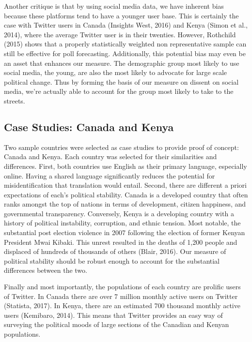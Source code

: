 \documentclass[12pt]{article}
\begin{document}
\begin{spacing}{1.5}
Another critique is that by using social media data, we have inherent bias because these platforms tend to have a younger user base. This is certainly the case with Twitter users in Canada (Insights West, 2016) and Kenya (Simon et al., 2014), where the average Twitter user is in their twenties. However, Rothchild (2015) shows that a properly statistically weighted non representative sample can still be effective for poll forecasting. Additionally, this potential bias may even be an asset that enhances our measure. The demographic group most likely to use social media, the young, are also the most likely to advocate for large scale political change. Thus by forming the basis of our measure on dissent on social media, we're actually able to account for the group most likely to take to the streets.

\subsection*{Case Studies: Canada and Kenya}

Two sample countries were selected as case studies to provide proof of concept: Canada and Kenya. Each country was selected for their similarities and differences. First, both countries use English as their primary language, especially online. Having a shared language significantly reduces the potential for misidentification that translation would entail. Second, there are different a priori expectations of each’s political stability. Canada is a developed country that often ranks amongst the top of nations in terms of development, citizen happiness, and governmental transparency. Conversely, Kenya is a developing country with a history of political instability, corruption, and ethnic tension. Most notable, the substantial post election violence in 2007 following the election of former Kenyan President Mwai Kibaki. This unrest resulted in the deaths of 1,200 people and displaced of hundreds of thousands of others (Blair, 2016). Our measure of political stability should be robust enough to account for the substantial differences between the two.  

Finally and most importantly, the populations of each country are prolific users of Twitter. In Canada there are over 7 million monthly active users on Twitter (Statista, 2017). In Kenya, there are an estimated 700 thousand monthly active users (Kemibaro, 2014). This means that Twitter provides an easy way of surveying the political moods of large sections of the Canadian and Kenyan populations. 


\end{spacing}
\end{document}
